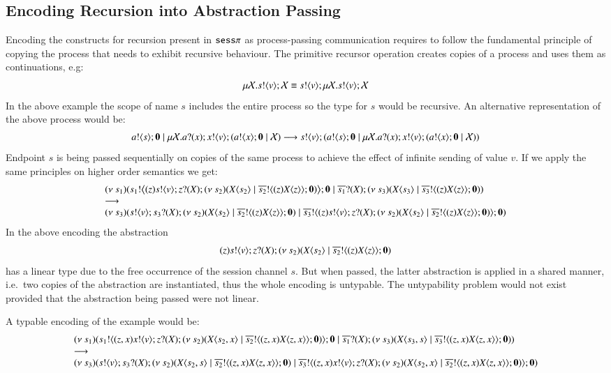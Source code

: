 \subsection{Encoding Recursion into Abstraction Passing}
Encoding the constructs for recursion present in $\mathtt{sess}\pi$ as process-passing communication requires to follow the fundamental
principle of copying the process that needs to exhibit recursive behaviour.
The primitive recursor operation creates copies of a process and uses them
as continuations, e.g:
\[
	\mu \mathcal{X}. s ! \langle v \rangle ; \mathcal{X} \equiv s ! \langle v \rangle ; \mu \mathcal{X}. s ! \langle v \rangle ; \mathcal{X}
\]
In the above example the scope of name $s$ includes the entire process so
the type for $s$ would be recursive. An alternative representation
of the above process would be:
\[
	a ! \langle s \rangle ; \mathbf{0} \;|\; \mu \mathcal{X}. a ? (x) ; x ! \langle v \rangle ; (a ! \langle x \rangle ; \mathbf{0} \;|\; \mathcal{X}) \longrightarrow s ! \langle v \rangle ; (a ! \langle s \rangle ; \mathbf{0} \;|\; \mu \mathcal{X}. a ? (x) ; x ! \langle v \rangle ; (a ! \langle x \rangle ; \mathbf{0} \;|\; \mathcal{X}))
\]
Endpoint $s$ is being passed sequentially on copies of the 
same process to achieve the effect of infinite sending of value $v$.
If we apply the same principles on higher order semantics we get:
\[
	\begin{array}{l}
	(\nu\ s_1)(s_1 ! \big\langle (z) s ! \langle v \rangle ; z ? (X) ; (\nu\ s_2)(X\langle s_2 \rangle \;|\; \overline{s_2} ! \langle (z) X\langle z \rangle  \rangle ; \mathbf{0})  \big\rangle ; \mathbf{0} \;|\; \overline{s_1} ? (X) ; (\nu\ s_3)(X\langle s_3 \rangle \;|\; \overline{s_3} ! \langle (z) X\langle z \rangle \rangle ; \mathbf{0} ) )
		\\
		\longrightarrow
		\\
		(\nu\ s_3)(s ! \langle v \rangle ; s_3 ? (X) ; (\nu\ s_2)(X\langle s_2 \rangle \;|\; \overline{s_2} ! \langle (z) X\langle z \rangle \rangle ; \mathbf{0}) \;|\; \overline{s_3} ! \langle (z) s ! \langle v \rangle ; z ? (X) ; (\nu\ s_2)(X\langle s_2 \rangle \;|\; \overline{s_2} ! \langle (z) X\langle z \rangle  \rangle ; \mathbf{0})   \rangle ; \mathbf{0} )
	\end{array}
\]
In the above encoding the abstraction
$$(z) s ! \langle v \rangle ; z ? (X) ; (\nu\ s_2)(X\langle s_2 \rangle \;|\; \overline{s_2} ! \langle (z) X\langle z \rangle  \rangle ; \mathbf{0})$$
has a linear type due to the free occurrence of the session channel $s$.
But when passed, the latter abstraction is applied in a shared manner, i.e.\ two
copies of the abstraction are instantiated, thus the whole
encoding is untypable. The untypability problem would not exist
provided that the abstraction being passed were not linear.

A typable encoding of the example would be:
\[
	\begin{array}{l}
		(\nu\ s_1)(s_1 ! \langle (z,x) x ! \langle v \rangle ; z ? (X) ; (\nu\ s_2)(X\langle s_2,x \rangle \;|\; \overline{s_2} ! \langle (z,x) X\langle z,x \rangle  \rangle ; \mathbf{0})  \rangle ; \mathbf{0} \;|\; \overline{s_1} ? (X) ; (\nu\ s_3)(X\langle s_3,s \rangle \;|\; \overline{s_3} ! \langle (z,x) X\langle z,x \rangle \rangle ; \mathbf{0} ) )
		\\
		\longrightarrow
		\\
		(\nu\ s_3)(s ! \langle v \rangle ; s_3 ? (X) ; (\nu\ s_2)(X\langle s_2, s \rangle \;|\; \overline{s_2} ! \langle (z, x) X\langle z, x \rangle \rangle ; \mathbf{0}) \;|\; \overline{s_3} ! \langle (z, x) x ! \langle v \rangle ; z ? (X) ; (\nu\ s_2)(X\langle s_2, x \rangle \;|\; \overline{s_2} ! \langle (z, x) X\langle z, x \rangle  \rangle ; \mathbf{0})   \rangle ; \mathbf{0} )
	\end{array}
\]


